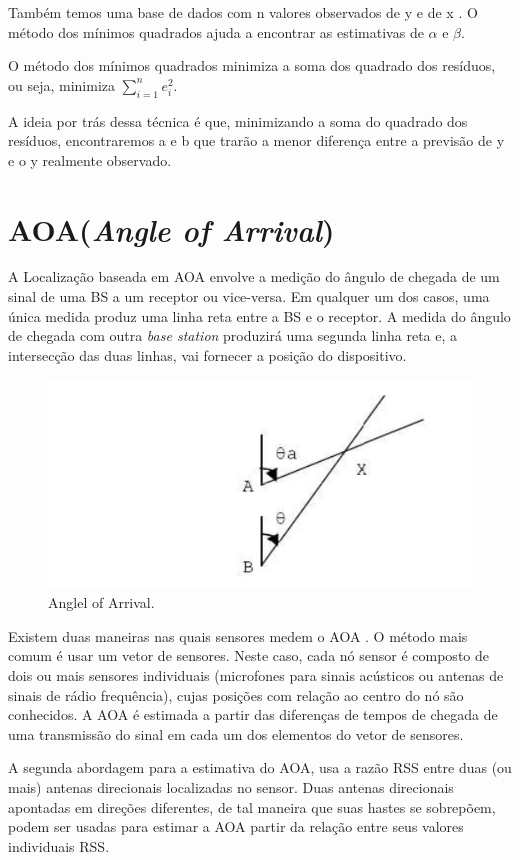 Também temos uma base de dados com n valores observados de y e de x . 
O método dos mínimos quadrados ajuda a encontrar as estimativas de $\alpha$ e $\beta$.

O método dos mínimos quadrados minimiza a soma dos quadrado dos resíduos, ou seja, minimiza $\sum_{i=1}^n e_i^2$.

A ideia por trás dessa técnica é que, minimizando a soma do quadrado dos resíduos, encontraremos a e b que trarão 
a menor diferença entre a previsão de y e o y realmente observado.

\section{AOA(\textit{Angle of Arrival})}
A Localização baseada em AOA envolve a medição do ângulo de chegada de um sinal de uma BS
a um receptor ou vice-versa. Em qualquer um dos casos, uma única medida produz uma linha reta 
entre a BS e o receptor. A medida do ângulo de chegada com outra \textit{base station}
produzirá uma segunda linha reta e, a intersecção das duas linhas, vai fornecer a posição
do dispositivo\cite{aoa3}.
	\begin{figure}[hb]
	\centering
	\includegraphics[scale=0.5]{images/aoa.png}
	\caption{Anglel of Arrival\cite{aoa3}. }
	\label{fig:aoa}
	\end{figure}
	
      Existem duas maneiras nas quais sensores medem o AOA \cite{aoa}. O método mais
comum é usar um vetor de sensores. Neste caso, cada nó sensor é
composto de dois ou mais sensores individuais (microfones para sinais acústicos ou antenas de sinais de rádio frequência),
cujas posições com relação ao centro do nó são conhecidos. A AOA é estimada a partir
das diferenças de tempos de chegada de uma transmissão do sinal em cada um dos elementos do vetor de sensores.

  A segunda abordagem para a estimativa do AOA, usa a razão RSS entre duas (ou
mais) antenas direcionais localizadas no sensor. Duas antenas direcionais apontadas em
direções diferentes, de tal maneira que suas hastes se sobrepõem, podem ser usadas para
estimar a AOA partir da relação entre seus valores individuais RSS.

